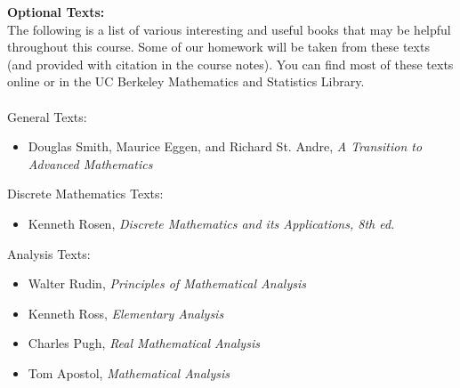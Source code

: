 \documentclass[11pt, a4paper]{article}
\begin{document}


\noindent\textbf{Optional Texts:} \\
The following is a list of various interesting and useful books that may be helpful throughout this course.
Some of our homework will be taken from these texts (and provided with citation in the course notes).
You can find most of these texts online or in the UC Berkeley Mathematics and Statistics Library. 
\\ \\
\noindent General Texts:
\begin{itemize}
    \item Douglas Smith, Maurice Eggen, and Richard St. Andre, \textit{A Transition to Advanced Mathematics}
\end{itemize}


\noindent Discrete Mathematics Texts:
\begin{itemize}
    \item Kenneth Rosen, \textit{Discrete Mathematics and its Applications, 8th ed.}
\end{itemize}

\noindent Analysis Texts:
\begin{itemize}
    \item  Walter Rudin, \textit{Principles of Mathematical Analysis}
    \item Kenneth Ross, \textit{Elementary Analysis}
    \item Charles Pugh, \textit{Real Mathematical Analysis}
    \item Tom Apostol, \textit{Mathematical Analysis}
\end{itemize}
\end{document}
